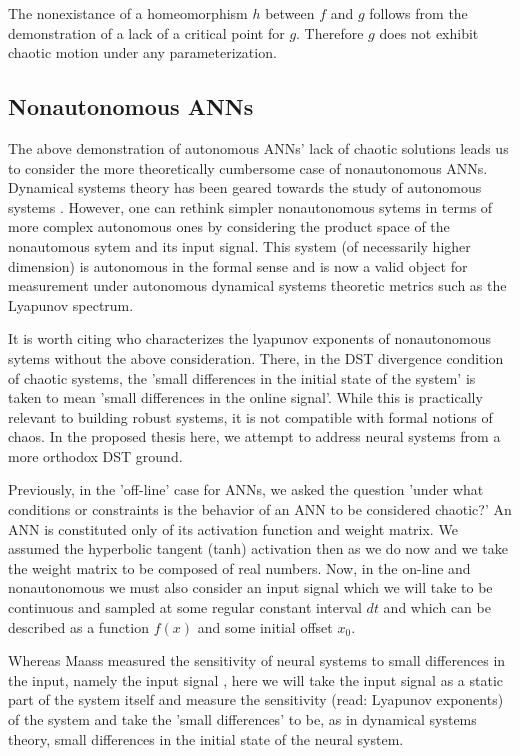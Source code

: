 \documentclass[12pt]{article}
\begin{document}
The nonexistance of a homeomorphism $h$ between $f$ and $g$ follows from the
demonstration of a lack of a critical point for $g$.  Therefore $g$ does not 
exhibit chaotic motion under any parameterization.

\subsection{Nonautonomous ANNs}
The above demonstration of autonomous ANNs' lack of chaotic solutions leads us
to consider the more theoretically cumbersome case of nonautonomous ANNs.
Dynamical systems theory has been geared towards the study of autonomous
systems \cite{hirsch}.  
However, one can rethink simpler nonautonomous sytems in
terms of more complex autonomous ones by considering the product space of
the nonautomous sytem and its input signal.  This system (of necessarily higher
dimension) is autonomous in the formal sense and is now a valid object for
measurement under autonomous dynamical systems theoretic metrics such as 
the Lyapunov spectrum.

It is worth citing \cite{maass_what_makes} 
who characterizes the lyapunov exponents of
nonautonomous sytems without the above consideration.  There, in the DST 
divergence condition of chaotic systems, the 'small differences in the 
initial state of the system' is taken to mean 'small differences in the online
signal'.  While this is practically relevant to building robust systems, it
is not compatible with formal notions of chaos.  In the proposed thesis here,
we attempt to address neural systems from a more orthodox DST ground.

Previously, in the 'off-line' case for ANNs, we asked the question 'under what
conditions or constraints is the behavior of an ANN to be considered chaotic?'
An ANN is constituted only of its activation function and weight matrix.  We
assumed the hyperbolic tangent (tanh) activation then as we do now and we
take the weight matrix to be composed of real numbers.  Now, in the on-line
and nonautonomous we must also consider
an input signal which we will take to be continuous and sampled at some regular
constant interval $dt$ and which can be described as a function $f(x)$ and some
initial offset $x_{0}$.

Whereas Maass measured the sensitivity of neural systems to small differences
in the input, namely the input signal \cite{maass_what_makes}, 
here we will take the input signal as
a static part of the system itself and measure the sensitivity (read:
Lyapunov exponents) of the system and take the 'small differences' to be, as
in dynamical systems theory, small differences in the initial state of 
the neural system.  
\end{document}
